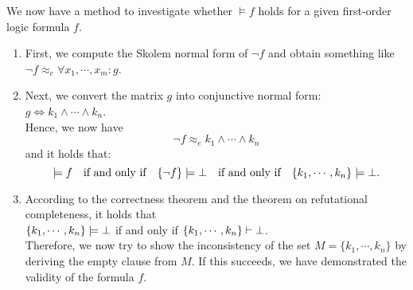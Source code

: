 \noindent
We now have a method to investigate whether $\models f$ holds for a given first-order logic formula $f$.
\begin{enumerate}
\item First, we compute the Skolem normal form of $\neg f$ and obtain something like \\[0.2cm]
      \hspace*{1.3cm} $\neg f \approx_e \forall x_1, \cdots, x_m \colon g$.
\item Next, we convert the matrix $g$ into conjunctive normal form: 
      \\[0.2cm]
      \hspace*{1.3cm}
    $g \Leftrightarrow k_1 \wedge \cdots \wedge k_n$.
      \\[0.2cm]
      Hence, we now have 
      \[ \neg f \approx_e k_1 \wedge \cdots \wedge k_n \] 
      and it holds that: 
      \[  
          \models f \quad \mbox{if and only if} \quad
          \{\neg f\} \models \bot \quad \mbox{if and only if} \quad 
          \{k_1,\cdots,k_n\} \models \bot.
      \]
\item According to the correctness theorem and the theorem on refutational completeness, it holds that
      \\[0.2cm]
      \hspace*{1.3cm} 
      $\{k_1,\cdots,k_n\} \models \bot$ \quad if and only if \quad 
      $\{k_1,\cdots,k_n\} \vdash \bot$. \\[0.2cm]
      Therefore, we now try to show the inconsistency of the set $M = \{ k_1, \cdots, k_n \}$ by deriving the empty clause from $M$.
      If this succeeds, we have demonstrated the validity of the formula $f$.
\end{enumerate}

